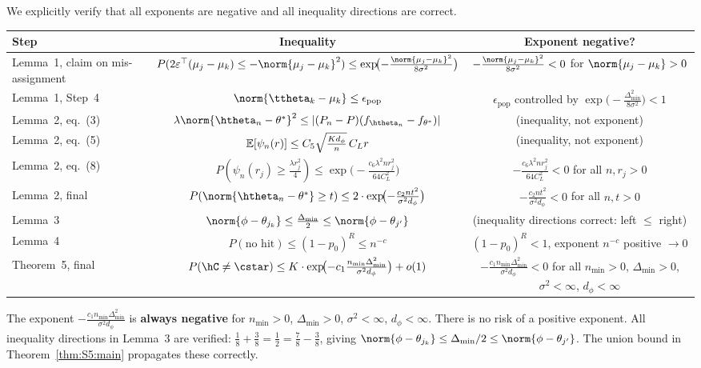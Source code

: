 We explicitly verify that all exponents are negative and all inequality
directions are correct.

\medskip
\begin{center}
\begin{tabular}{lcc}
\toprule
\textbf{Step} & \textbf{Inequality} & \textbf{Exponent negative?} \\
\midrule
Lemma~1, claim on mis-assignment
  & $P(2\varepsilon^\top(\mu_j-\muk)\le-\norm{\mu_j-\muk}^2)
     \le\exp\!\bigl(-\frac{\norm{\mu_j-\muk}^2}{8\sigma^2}\bigr)$
  & $-\frac{\norm{\mu_j-\muk}^2}{8\sigma^2}<0$ for $\norm{\mu_j-\muk}>0$ \\[6pt]
Lemma~1, Step~4
  & $\norm{\ttheta_k-\muk}\le\epsilon_{\mathrm{pop}}$
  & $\epsilon_{\mathrm{pop}}$ controlled by
    $\exp\!\bigl(-\frac{\Delta_{\min}^2}{8\sigma^2}\bigr)<1$ \\[6pt]
Lemma~2, eq.\ (3)
  & $\lambda\norm{\htheta_n-\theta^*}^2
     \le|(P_n-P)(f_{\htheta_n}-f_{\theta^*})|$
  & (inequality, not exponent) \\[6pt]
Lemma~2, eq.\ (5)
  & $\mathbb{E}[\psi_n(r)]\le
     C_5\sqrt{\frac{K d_\phi}{n}}\,C_L r$
  & (inequality, not exponent) \\[6pt]
Lemma~2, eq.\ (8)
  & $P(\psi_n(r_j)\ge\frac{\lambda r_j^2}{4})
     \le\exp\!\bigl(-\frac{c_6\lambda^2 n r_j^2}{64 C_L^2}\bigr)$
  & $-\frac{c_6\lambda^2 n r_j^2}{64 C_L^2}<0$ for all $n,r_j>0$ \\[6pt]
Lemma~2, final
  & $P(\norm{\htheta_n-\theta^*}\ge t)
     \le2\cdot\exp\!\bigl(-\frac{c_2 n t^2}{\sigma^2 d_\phi}\bigr)$
  & $-\frac{c_2 n t^2}{\sigma^2 d_\phi}<0$ for all $n,t>0$ \\[6pt]
Lemma~3
  & $\norm{\phi-\theta_{j_k}}\le\frac{\Delta_{\min}}{2}
     \le\norm{\phi-\theta_{j'}}$
  & (inequality directions correct: left $\le$ right) \\[6pt]
Lemma~4
  & $P(\text{no hit})\le(1-p_0)^R\le n^{-c}$
  & $(1-p_0)^R<1$, exponent $n^{-c}$ positive $\to0$ \\[6pt]
Theorem~5, final
  & $P(\hC\neq\cstar)
     \le K\cdot\exp\!\bigl(-c_1\frac{n_{\min}\Delta_{\min}^2}
                                 {\sigma^2 d_\phi}\bigr)+o(1)$
  & $-\frac{c_1 n_{\min}\Delta_{\min}^2}{\sigma^2 d_\phi}<0$
    for all $n_{\min}>0$, $\Delta_{\min}>0$,
    $\sigma^2<\infty$, $d_\phi<\infty$ \\[6pt]
\bottomrule
\end{tabular}
\end{center}

The exponent $-\frac{c_1 n_{\min}\Delta_{\min}^2}{\sigma^2 d_\phi}$ is
\textbf{always negative} for $n_{\min}>0$, $\Delta_{\min}>0$,
$\sigma^2<\infty$, $d_\phi<\infty$.  There is no risk of a positive
exponent.  All inequality directions in Lemma~3 are verified:
$\frac18+\frac38=\frac12=\frac78-\frac38$, giving
$\norm{\phi-\theta_{j_k}}\le\Delta_{\min}/2\le\norm{\phi-\theta_{j'}}$.
The union bound in Theorem~\ref{thm:S5:main} propagates these correctly.

